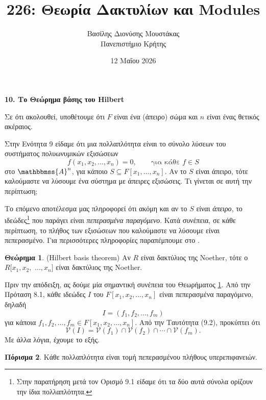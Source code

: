 \documentclass[12pt,a4paper,reqno]{amsart}
\title{226: Θεωρία Δακτυλίων και Modules}
\author[Β.~Δ. Μουστακας]{Βασίλης Διονύσης Μουστάκας \\ Πανεπιστήμιο Κρήτης}
\date{12 Μαΐου 2026}
\theoremstyle{definition}
\newtheorem{theorem}{Θεώρημα}
\newtheorem{corollary}[theorem]{Πόρισμα}
\theoremstyle{remark}
\numberwithin{theorem}{section}
\numberwithin{exercise}{section}
\numberwithin{equation}{section}
\renewcommand{\AA}{\mathbbmss{A}}
\newcommand{\vV}{\mathcal{V}}
\newcommand{\Pol}[1]{F[x_1, x_2, \dots, x_{#1}]}
\begin{document}
\begingroup
\def\uppercasenonmath#1{} %
\let\MakeUppercase\relax %
\maketitle
\endgroup

\setcounter{section}{10}
\begin{center}
    \textbf{10. Το Θεώρημα βάσης του Hilbert
} 
\end{center}

Σε ότι ακολουθεί, υποθέτουμε ότι $F$ είναι ένα (άπειρο) σώμα και $n$ είναι ένας θετικός ακέ\-ραιος.

Στην Ενότητα 9 είδαμε ότι μια πολλαπλότητα είναι το σύνολο λύσεων του συστήματος πολυωνυμικών εξισώσεων 
\[
f(x_1, x_2, \dots, x_n) = 0, \qquad \text{για κάθε $f \in S$}
\]
στο $\AA^n$, για κάποιο $S \subseteq F[x_1, \dots, x_n]$. Αν το $S$ είναι άπειρο, τότε καλούμαστε να λύσουμε ένα σύστημα με άπειρες εξισώσεις. Τι γίνεται σε αυτή την περίπτωση;

Το επόμενο αποτέλεσμα μας πληροφορεί ότι ακόμη και αν το $S$ είναι \emph{άπειρο}, το ιδεώδες\footnote{Στην παρατήρηση μετά τον Ορισμό 9.1 είδαμε ότι τα δύο αυτά σύνολα ορίζουν την ίδια πολλαπλότητα.} που παράγει είναι \emph{πεπερασμένα παραγόμενο}. Κατά συνέπεια, σε κάθε περίπτωση, το πλήθος των εξισώσεων που καλούμαστε να λύσουμε είναι πεπερασμένο. Για περισσότερες πληροφορίες παραπέμπουμε στο \cite[Ενότητα~9.6]{DF04}.

\begin{theorem}{\rm(Hilbert basis theorem)}
    \label{thm:hilbert_basis}
    Αν $R$ είναι δακτύλιος της Noether, τότε ο $R[x_1, x_2,$ $\dots, x_n]$ είναι δακτύλιος της Noether.
\end{theorem}

Πριν την απόδειξη, ας δούμε μία σημαντική συνέπεια του Θεωρήματος \ref{thm:hilbert_basis}. Από την Πρόταση 8.1, κάθε ιδεώδες $I$ του $\Pol{n}$ είναι πεπερασμένα παραγόμενο, δηλαδή 
\[
I = (f_1, f_2, \dots, f_m)
\]
για κάποια $f_1, f_2, \dots, f_m \in \Pol{n}$. Από την Ταυτότητα (9.2), προκύπτει ότι 
\[
\vV(I) = \vV(f_1) \cap \vV(f_2) \cap \cdots \cap \vV(f_m).
\]
Με άλλα λόγια, έχουμε το εξής.
\begin{corollary}
    \label{cor:variety_is_the_intersection_of_hypersurfaces}
    Κάθε πολλαπλότητα είναι τομή πεπερασμένου πλήθους υπερεπιφανειών.
\end{corollary}
\end{document}
